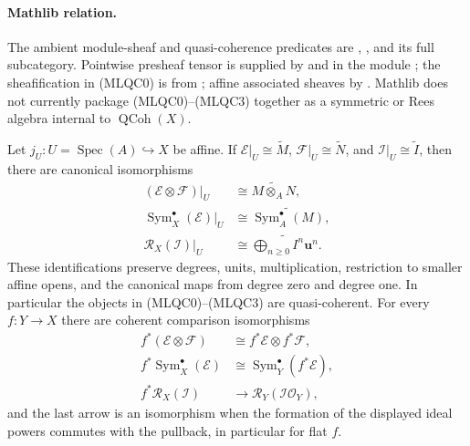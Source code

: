 \begin{definition}
  \paragraph{Mathlib relation.}
  The ambient module-sheaf and quasi-coherence predicates are
  \texttt{},
  \texttt{}, and its full
  subcategory.  Pointwise presheaf tensor is supplied by
  \texttt{} and
  \texttt{} in the
  module
  \texttt{};
  the sheafification in (MLQC0) is
  \texttt{} from
  \texttt{};
  affine associated
  sheaves by \texttt{}.
  Mathlib does not currently package (MLQC0)--(MLQC3) together as a
  symmetric or Rees algebra internal to $\operatorname{QCoh}(X)$.
\end{definition}

\begin{lemma}
  \label{lemma:nagata-qcoh-graded-algebra-interface}

  Let $j_U\colon U=\operatorname{Spec}(A)\hookrightarrow X$ be affine.  If
  $\mathcal E|_U\cong\widetilde M$,
  $\mathcal F|_U\cong\widetilde N$, and
  $\mathcal I|_U\cong\widetilde I$, then there are canonical isomorphisms
  \[
  \begin{aligned}
    (\mathcal E\otimes\mathcal F)|_U
      &\cong\widetilde{M\otimes_A N},\\
    \operatorname{Sym}_X^\bullet(\mathcal E)|_U
      &\cong\widetilde{\operatorname{Sym}_A^\bullet(M)},\\
    \mathcal R_X(\mathcal I)|_U
      &\cong\widetilde{\bigoplus_{n\geq0}I^n\mathbf u^n}.
  \end{aligned}                                                    \tag{MLQC4}
  \]
  These identifications preserve degrees, units, multiplication, restriction
  to smaller affine opens, and the canonical maps from degree zero and degree
  one.  In particular the objects in (MLQC0)--(MLQC3) are quasi-coherent.
  For every $f\colon Y\to X$ there are coherent comparison isomorphisms
  \[
  \begin{aligned}
    f^*(\mathcal E\otimes\mathcal F)
      &\cong f^*\mathcal E\otimes f^*\mathcal F,\\
    f^*\operatorname{Sym}_X^\bullet(\mathcal E)
      &\cong\operatorname{Sym}_Y^\bullet(f^*\mathcal E),\\
    f^*\mathcal R_X(\mathcal I)
      &\longrightarrow\mathcal R_Y(\mathcal I\mathcal O_Y),
  \end{aligned}                                                    \tag{MLQC5}
  \]
  and the last arrow is an isomorphism when the formation of the displayed
  ideal powers commutes with the pullback, in particular for flat $f$.
\end{lemma}

